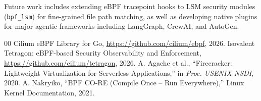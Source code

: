 \documentclass[conference]{IEEEtran}
\begin{document}
Future work includes extending eBPF tracepoint hooks to LSM security modules (\texttt{bpf\_lsm}) for fine-grained file path matching, as well as developing native plugins for major agentic frameworks including LangGraph, CrewAI, and AutoGen.

\begin{thebibliography}{00}
 Cilium eBPF Library for Go, \url{https://github.com/cilium/ebpf}, 2026.
 Isovalent Tetragon: eBPF-based Security Observability and Enforcement, \url{https://github.com/cilium/tetragon}, 2026.
 A. Agache et al., ``Firecracker: Lightweight Virtualization for Serverless Applications,'' in \textit{Proc. USENIX NSDI}, 2020.
 A. Nakryiko, ``BPF CO-RE (Compile Once -- Run Everywhere),'' Linux Kernel Documentation, 2021.
\end{thebibliography}
\end{document}
